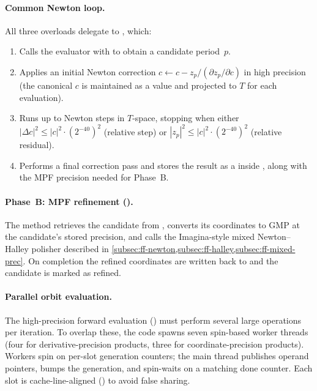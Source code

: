 \paragraph{Common Newton loop.}
All three  overloads delegate to
,
which:
\begin{enumerate}
\item Calls the evaluator with  to obtain a candidate
  period~$p$.
\item Applies an initial Newton correction
  $c \leftarrow c - z_p / (\partial z_p/\partial c)$ in high precision
  (the canonical $c$ is maintained as a  value and
  projected to $T$ for each evaluation).
\item Runs up to  Newton steps in $T$-space, stopping when
  either
  $|\Delta c|^2 \le |c|^2 \cdot (2^{-40})^2$ (relative step) or
  $|z_p|^2 \le |c|^2 \cdot (2^{-40})^2$ (relative residual).
\item Performs a final correction pass and stores the result as a
   inside , along with the
  MPF precision needed for Phase~B.
\end{enumerate}

\paragraph{Phase~B: MPF refinement ().}
The method retrieves the candidate from , converts
its coordinates to GMP  at the candidate's stored precision,
and calls the Imagina-style mixed Newton--Halley polisher described in
\cref{subsec:ff-newton,subsec:ff-halley,subsec:ff-mixed-prec}.  On
completion the refined coordinates are written back to 
and the candidate is marked as refined.

\paragraph{Parallel orbit evaluation.}
The high-precision forward evaluation
() must perform several large
 operations per iteration.  To overlap these, the code spawns
seven spin-based worker threads (four for derivative-precision products,
three for coordinate-precision products).  Workers spin on per-slot
 generation counters;
the main thread
publishes operand pointers, bumps the generation, and spin-waits on a
matching done counter.  Each slot is cache-line-aligned ()
to avoid false sharing.

